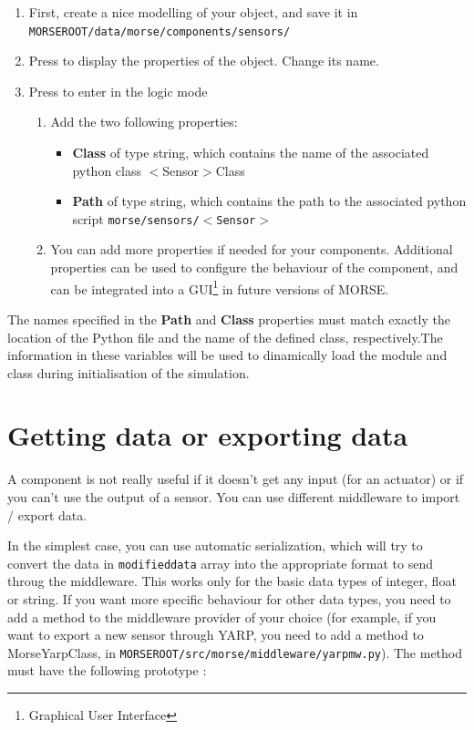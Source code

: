 \documentclass[twoside,a4paper,10pt]{report}
\newcommand{\key}[1]{\fcolorbox{Dark}{Light}{\textbf{#1}}}
\newcommand{\dokutitleleveltwo}[1]{\section{#1}}
\newcommand{\dokufootnote}[1]{\footnote{#1}}
\newcommand{\dokubold}[1]{\textbf{#1}}
\newcommand{\dokumonospace}[1]{\texttt{#1}}
\newcommand{\dokuitem}{\item}
\begin{document}
\begin{enumerate}\dokuitem  First, create a nice modelling of your object, and save it in \dokumonospace{{\textdollar}MORSE{\textunderscore}ROOT/data/morse/components/sensors/}
\dokuitem  Press \key{N} to display the properties of the object. Change its name.
\dokuitem  Press \key{F4} to enter in the logic mode
\begin{enumerate}\dokuitem  Add the two following properties:
\begin{itemize}
\dokuitem  \dokubold{Class} of type string, which contains the name of the associated python class $<$Sensor$>$Class
\dokuitem  \dokubold{Path} of type string, which contains the path to the associated python script \dokumonospace{morse/sensors/$<$Sensor$>$}	 
\end{itemize}

\dokuitem  You can add more properties if needed for your components. Additional properties can be used to configure the behaviour of the component, and can be integrated into a GUI\dokufootnote{Graphical User Interface} in future versions of MORSE.
\end{enumerate}

\end{enumerate}

The names specified in the \dokubold{Path} and \dokubold{Class} properties must match exactly the location of the Python file and the name of the defined class, respectively.The information in these variables will be used to dinamically load the module and class during initialisation of the simulation.


\dokutitleleveltwo{Getting data or exporting data}
\label{25ef0239968ec09d3b173110a151ecdc}%

A component is not really useful if it doesn't get any input (for an actuator)
or if you can't use the output of a sensor. You can use different middleware to
import / export data. 

In the simplest case, you can use automatic serialization, which will try to convert the data in \dokumonospace{modified{\textunderscore}data} array into the appropriate format to send throug the middleware. This works only for the basic data types of integer, float or string.
If you want more specific behaviour for other data types, you need to add a method to the middleware provider of your choice
(for example, if you want to export a new sensor through YARP, you need to add
a method to MorseYarpClass, in \dokumonospace{{\textdollar}MORSE{\textunderscore}ROOT/src/morse/middleware/yarp{\textunderscore}mw.py}). The method must have the following prototype :
\end{document}
